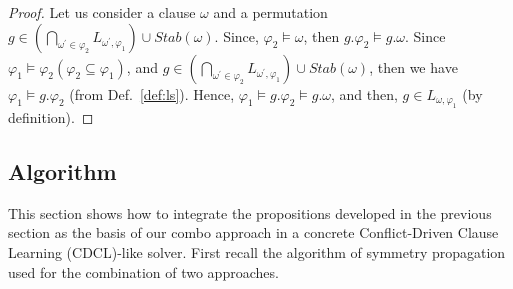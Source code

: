 \begin{proof}
 Let us consider a clause $\omega$ and a permutation $g \in 
 (\underset{\omega^\prime \in \varphi_2}{\bigcap}L_{\omega^\prime,\varphi_1})
 \cup Stab(\omega)$.
 Since, $\varphi_2 \models \omega$, then  $g.\varphi_2 \models g.\omega$. Since $\varphi_1 \models \varphi_2 (\varphi_2 \subseteq \varphi_1)$, and 
 $g \in 
 (\underset{\omega^\prime \in \varphi_2}{\bigcap}L_{\omega^\prime,\varphi_1})
 \cup Stab(\omega)$, then we have $\varphi_1 \models g.\varphi_2$ (from Def.~\ref{def:ls}). Hence, $\varphi_1 \models g.\varphi_2 \models g.\omega$, and then, $g \in L_{\omega,\varphi_1}$ (by definition). 
\end{proof}
\subsection{Algorithm}
This section shows how to integrate the propositions developed in the previous
section as the basis of our combo approach in a concrete
Conflict-Driven Clause Learning (CDCL)-like solver.
First recall the algorithm of symmetry propagation used for the combination of two approaches.


